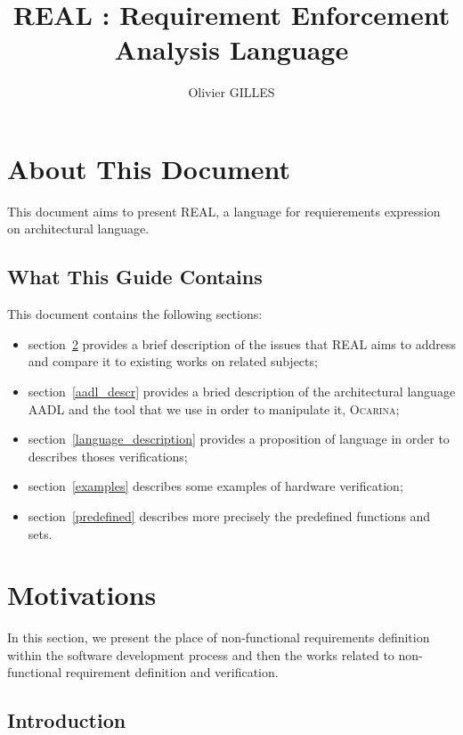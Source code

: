 \documentclass[a4paper,10pt]{article}
\title{
  \textbf{REAL : Requirement Enforcement Analysis Language}
}
\author{Olivier GILLES}
\newcommand{\aadl} {\textsc{AADL}}
\newcommand{\real}{\textsc{REAL}}
\newcommand{\ocarina}{\textsc{Ocarina}}
\begin{document}
\maketitle
\newpage
\tableofcontents
\newpage

\section {About This Document}

This document aims to present \real{}, a language for requierements
expression on architectural language.

\subsection {What This Guide Contains}

This document contains the following sections:
\begin {itemize}

\item section~\ref{Intro} provides a brief description of the issues 
that \real{} aims to address and compare it to existing works on 
related subjects;

\item section~\ref{aadl_descr} provides a bried description of the 
architectural language \aadl{} and the tool that we use in order to 
manipulate it, \ocarina{};

\item section~\ref{language_description} provides a proposition of 
language in order to describes thoses verifications;

\item section~\ref {examples} describes some examples of hardware 
verification;

\item section~\ref {predefined} describes more precisely the 
predefined functions and sets.
\end {itemize}


\section{Motivations}
\label {Intro}

In this section, we present the place of non-functional requirements
definition within the software development process and then the works
related to non-functional requirement definition and verification.

\subsection {Introduction}
\end{document}
